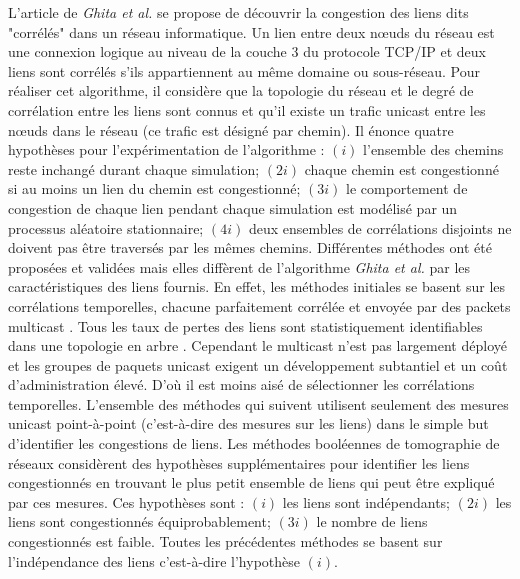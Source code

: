 L'article de {\em Ghita et al.} \cite{ghitaArgyrakiThiran2010} se propose de d\'ecouvrir la congestion des liens dits "corr\'el\'es" dans un r\'eseau informatique.
Un lien entre deux n\oe uds du r\'eseau est une connexion logique au niveau de la couche $3$ du protocole TCP/IP et deux liens sont corr\'el\'es s'ils appartiennent au m\^eme domaine ou sous-r\'eseau.
Pour r\'ealiser cet algorithme, il consid\`ere que la topologie du r\'eseau et le degr\'e de corr\'elation entre les liens sont connus et qu'il existe un trafic unicast entre les n\oe uds dans le r\'eseau (ce trafic est d\'esign\'e par chemin).
Il \'enonce quatre hypoth\`eses pour l'exp\'erimentation de l'algorithme : 
$(i)$ l'ensemble des chemins reste inchang\'e durant chaque simulation; 
$(2i)$ chaque chemin est congestionn\'e si au moins un lien du chemin est congestionn\'e; 
$(3i)$ le comportement de congestion de chaque lien pendant chaque simulation est mod\'elis\'e par un processus al\'eatoire stationnaire; 
$(4i)$ deux ensembles de corr\'elations disjoints ne doivent pas \^etre travers\'es par les m\^emes chemins.
\newline
Diff\'erentes m\'ethodes ont \'et\'e propos\'ees et valid\'ees mais elles diff\`erent de l'algorithme {\em Ghita et al.} \cite{ghitaArgyrakiThiran2010} par les caract\'eristiques des liens fournis.
En effet, les m\'ethodes initiales se basent sur les corr\'elations temporelles, chacune parfaitement corr\'el\'ee et envoy\'ee par des packets multicast \cite{adamsBuFreidmanHorowitz2000, aryaDuffieldVeitch2008, buDuffieldPrestiTowsley2002, caceresDuffieldHorowistzTowsley1999}. 
Tous les taux de pertes des liens sont statistiquement identifiables dans une topologie en arbre \cite{chenCaoBu2007}.
Cependant le multicast n'est pas largement d\'eploy\'e et les groupes de paquets unicast exigent un d\'eveloppement subtantiel et un co\^ut d'administration \'elev\'e. D'o\`u il est moins ais\'e de s\'electionner les corr\'elations temporelles.
\newline
L'ensemble des m\'ethodes qui suivent \cite{nGDuffield2006, padmanabhanQiuWang2003,sommerBarfordDuffieldRon2007, zhaoChenBindel2006} utilisent seulement des mesures unicast point-\`a-point (c'est-\`a-dire des mesures sur les liens) dans le simple but d'identifier les congestions de liens.
\newline
Les m\'ethodes bool\'eennes de tomographie de r\'eseaux consid\`erent des hypoth\`eses suppl\'ementaires \cite{padmanabhanQiuWang2003,nGDuffield2006} pour identifier les liens congestionn\'es en trouvant le plus petit ensemble de liens qui peut \^etre expliqu\'e par ces mesures.
Ces hypoth\`eses sont : 
$(i)$ les liens sont ind\'ependants;
$(2i)$ les liens sont congestionn\'es \'equiprobablement; 
$(3i)$ le nombre de liens congestionn\'es est faible.
Toutes les pr\'ec\'edentes m\'ethodes \cite{ghitaArgyrakiThiran2010, nGDuffield2006, padmanabhanQiuWang2003,sommerBarfordDuffieldRon2007, zhaoChenBindel2006} se basent sur l'ind\'ependance des liens c'est-\`a-dire l'hypoth\`ese $(i)$.

